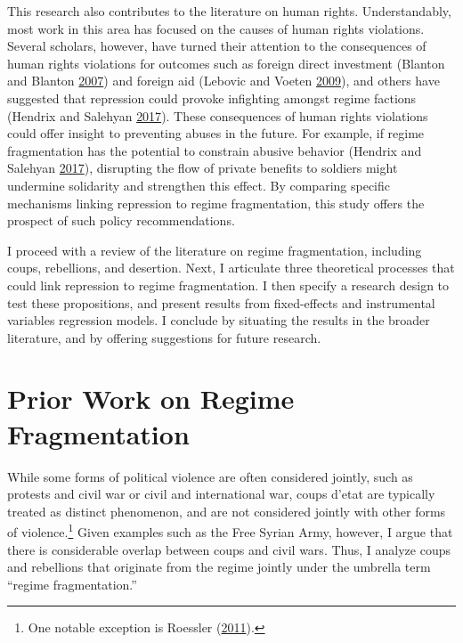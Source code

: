 \documentclass[12pt,]{article}
\let\rmarkdownfootnote\footnote%
\def\footnote{\protect\rmarkdownfootnote}
\theoremstyle{definition}
\theoremstyle{definition}
\theoremstyle{definition}
\theoremstyle{remark}
\begin{document}
This research also contributes to the literature on human rights.
Understandably, most work in this area has focused on the causes of
human rights violations. Several scholars, however, have turned their
attention to the consequences of human rights violations for outcomes
such as foreign direct investment (Blanton and Blanton
\protect\hyperlink{ref-Blanton2007}{2007}) and foreign aid (Lebovic and
Voeten \protect\hyperlink{ref-Lebovic2009}{2009}), and others have
suggested that repression could provoke infighting amongst regime
factions (Hendrix and Salehyan
\protect\hyperlink{ref-Hendrix2017}{2017}). These consequences of human
rights violations could offer insight to preventing abuses in the
future. For example, if regime fragmentation has the potential to
constrain abusive behavior (Hendrix and Salehyan
\protect\hyperlink{ref-Hendrix2017}{2017}), disrupting the flow of
private benefits to soldiers might undermine solidarity and strengthen
this effect. By comparing specific mechanisms linking repression to
regime fragmentation, this study offers the prospect of such policy
recommendations.

I proceed with a review of the literature on regime fragmentation,
including coups, rebellions, and desertion. Next, I articulate three
theoretical processes that could link repression to regime
fragmentation. I then specify a research design to test these
propositions, and present results from fixed-effects and instrumental
variables regression models. I conclude by situating the results in the
broader literature, and by offering suggestions for future research.

\hypertarget{prior-work-on-regime-fragmentation}{%
\section{Prior Work on Regime
Fragmentation}\label{prior-work-on-regime-fragmentation}}

While some forms of political violence are often considered jointly,
such as protests and civil war or civil and international war, coups
d'etat are typically treated as distinct phenomenon, and are not
considered jointly with other forms of violence.\footnote{One notable
  exception is Roessler (\protect\hyperlink{ref-Roessler2011}{2011}).}
Given examples such as the Free Syrian Army, however, I argue that there
is considerable overlap between coups and civil wars. Thus, I analyze
coups and rebellions that originate from the regime jointly under the
umbrella term ``regime fragmentation.''
\end{document}
